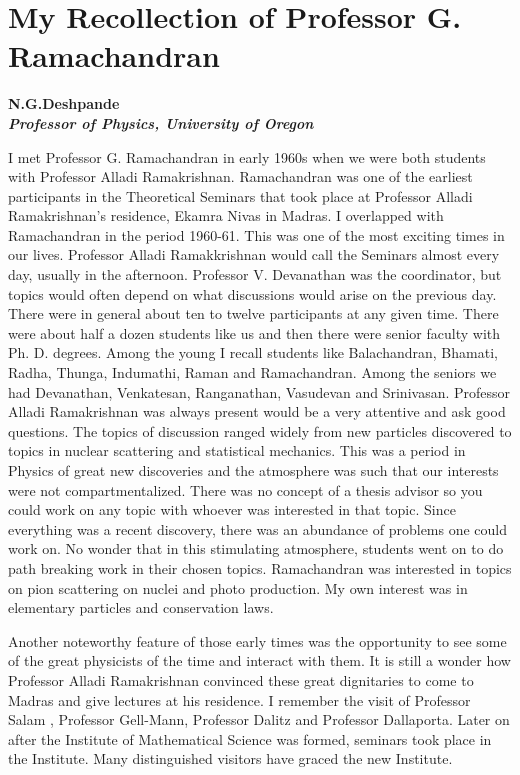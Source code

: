 \chapter{My Recollection of Professor G. Ramachandran}\label{chap2}


\begin{center}
\textbf{N.G.Deshpande}\\
\textbf{\textit{Professor of Physics, University of Oregon}}
\end{center}

I met Professor G. Ramachandran in early 1960s when we were both students with Professor Alladi Ramakrishnan.  Ramachandran was one of the earliest participants in the Theoretical Seminars that took place at Professor Alladi Ramakrishnan’s residence, Ekamra  Nivas in Madras. I overlapped with Ramachandran in the period 1960-61. This was one of the most exciting times in our lives. Professor Alladi Ramakkrishnan would call the Seminars almost every day, usually in the afternoon. Professor V. Devanathan was the coordinator, but topics would often depend on what discussions would arise on  the previous day. There were in general about ten to twelve participants at any given time. There were about half a dozen students like us and then there were senior faculty with Ph. D. degrees. Among the young I recall students like Balachandran, Bhamati, Radha, Thunga, Indumathi, Raman and Ramachandran. Among the seniors we had Devanathan, Venkatesan, Ranganathan, Vasudevan and Srinivasan. Professor Alladi Ramakrishnan was always present would be a very attentive and ask good questions. The topics of discussion ranged widely from new particles discovered to topics in nuclear scattering and statistical mechanics. This was a period in Physics of great new discoveries and the atmosphere was such that our interests were not compartmentalized. There was no concept of a thesis advisor so you could work on any topic with whoever was interested in that topic. Since everything was a recent discovery, there was an abundance of problems one could work on. No wonder that in this stimulating atmosphere, students went on to do path breaking work in their chosen topics. Ramachandran was interested in topics on pion scattering on nuclei and photo production. My own interest was in  elementary particles and conservation laws. 

Another noteworthy feature of those early times was the opportunity to see some of the great physicists of the time and interact with them. It is still a wonder how Professor Alladi Ramakrishnan convinced these great dignitaries to come to Madras and give lectures at his residence. I remember the visit of Professor Salam , Professor Gell-Mann, Professor Dalitz and Professor Dallaporta. Later on after the Institute of Mathematical Science was formed, seminars took place in the Institute. Many distinguished visitors have graced the new Institute.


